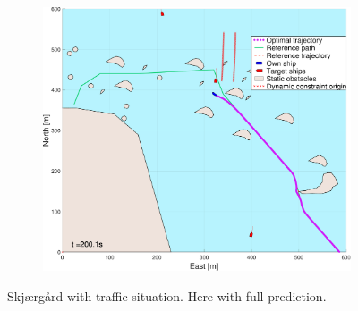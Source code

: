 \begin{figure}[ht]
\begin{subfigure}[b]{0.494\textwidth}
        \subcaption{}
    \end{subfigure}
    \hfill
    \begin{subfigure}[b]{0.494\textwidth}
        \centering
        \includegraphics[width=\textwidth]{Images/NewFigures/skjergard_m_trafikk_NEW/_Simple_0fig999_time=201}
        \subcaption{}
    \end{subfigure}
    \hfill
    \caption{Skjærgård with traffic situation. Here with full prediction.}
\end{figure}
